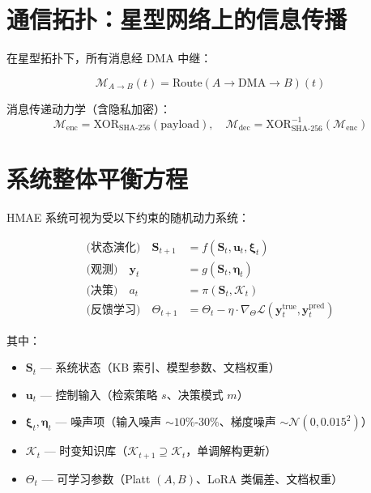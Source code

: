\documentclass[11pt,a4paper]{ctexart}
\theoremstyle{remark}
\begin{document}
\section{通信拓扑：星型网络上的信息传播}

在星型拓扑下，所有消息经 DMA 中继：

\begin{equation}
\mathcal{M}_{A \to B}(t) = \text{Route}(A \to \text{DMA} \to B)(t)
\end{equation}

消息传递动力学（含隐私加密）：
\begin{equation}
\mathcal{M}_{\text{enc}} = \text{XOR}_{\text{SHA-256}}(\text{payload}), \quad
\mathcal{M}_{\text{dec}} = \text{XOR}_{\text{SHA-256}}^{-1}(\mathcal{M}_{\text{enc}})
\end{equation}

\section{系统整体平衡方程}

HMAE 系统可视为受以下约束的随机动力系统：

\begin{align}
\text{(状态演化)} \quad \mathbf{S}_{t+1} &= f(\mathbf{S}_t, \mathbf{u}_t, \boldsymbol{\xi}_t) \\
\text{(观测)} \quad \mathbf{y}_t &= g(\mathbf{S}_t, \boldsymbol{\eta}_t) \\
\text{(决策)} \quad a_t &= \pi(\mathbf{S}_t, \mathcal{K}_t) \\
\text{(反馈学习)} \quad \Theta_{t+1} &= \Theta_t - \eta \cdot \nabla_\Theta \mathcal{L}(\mathbf{y}_t^{\text{true}}, \mathbf{y}_t^{\text{pred}})
\end{align}

其中：
\begin{itemize}[nosep]
\item $\mathbf{S}_t$ — 系统状态（KB 索引、模型参数、文档权重）
\item $\mathbf{u}_t$ — 控制输入（检索策略 $s$、决策模式 $m$）
\item $\boldsymbol{\xi}_t, \boldsymbol{\eta}_t$ — 噪声项（输入噪声 $\sim 10\%$-$30\%$、梯度噪声 $\sim \mathcal{N}(0, 0.015^2)$）
\item $\mathcal{K}_t$ — 时变知识库（$\mathcal{K}_{t+1} \supseteq \mathcal{K}_t$，单调解构更新）
\item $\Theta_t$ — 可学习参数（Platt $(A,B)$、LoRA 类偏差、文档权重）
\end{itemize}
\end{document}
